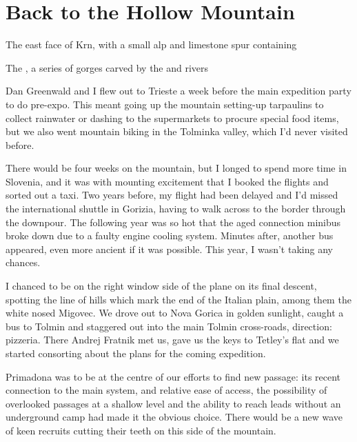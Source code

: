 \section{Back to the Hollow Mountain}
     \begin{marginfigure}
        \centering
        \caption{The east face of Krn, with a small alp and limestone spur containing \protect{}} \label{Krn}
    \end{marginfigure}
   \vspace{30pt}
    \begin{marginfigure}
        \centering
        \caption{ The \protect{}, a series of gorges carved by the \protect{} and \protect{} rivers } \label{Tolminka Gorge}
    \end{marginfigure}
Dan Greenwald and I flew out to Trieste a week before the main expedition party to do pre-expo. This meant going up the mountain setting-up tarpaulins to collect rainwater or dashing to the supermarkets to procure special food items, but we also went mountain biking in the Tolminka valley, which I'd never visited before.

 There would be four weeks on the mountain, but I longed to spend more time in Slovenia, and it was with mounting excitement that I booked the flights and sorted out a taxi. Two years before, my flight had been delayed and I'd missed the international shuttle in Gorizia, having to walk across to the border through the downpour. The following year was so hot that the aged connection minibus broke down due to a faulty engine cooling system. Minutes after, another bus appeared, even more ancient if it was possible. This year, I wasn't taking any chances.

I chanced to be on the right window side of the plane on its final descent, spotting the line of hills which mark the end of the Italian plain, among them the white nosed Migovec. We drove out to Nova Gorica in golden sunlight, caught a bus to Tolmin and staggered out into the main Tolmin cross-roads, direction: pizzeria. There Andrej Fratnik met us, gave us the keys to Tetley's flat and we started consorting about the plans for the coming expedition. 

Primadona was to be at the centre of our efforts to find new passage: its recent connection to the main system, and relative ease of access, the possibility of overlooked passages at a shallow level and the ability to reach leads without an underground camp had made it the obvious choice. There would be a new wave of keen recruits cutting their teeth on this side of the mountain. 

